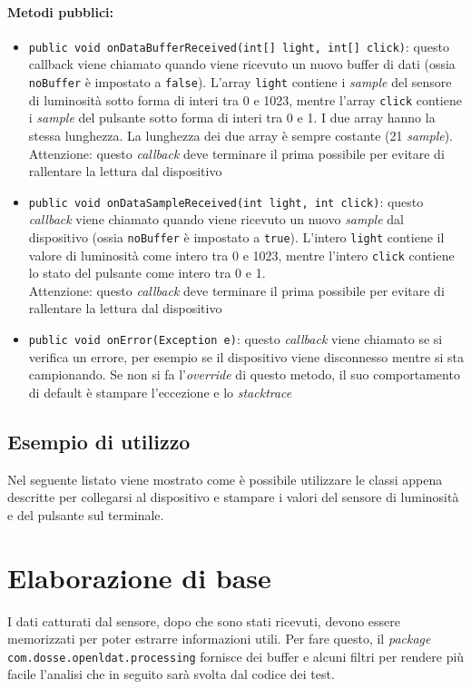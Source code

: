 \paragraph{Metodi pubblici:}\begin{itemize}
	\item \texttt{public void onDataBufferReceived(int[] light, int[] click){}}: questo callback viene chiamato quando viene ricevuto un nuovo buffer di dati (ossia \texttt{noBuffer} è impostato a \texttt{false}). L'array \texttt{light} contiene i \textit{sample} del sensore di luminosità sotto forma di interi tra 0 e 1023, mentre l'array \texttt{click} contiene i \textit{sample} del pulsante sotto forma di interi tra 0 e 1. I due array hanno la stessa lunghezza. La lunghezza dei due array è sempre costante (21 \textit{sample}).\\
	Attenzione: questo \textit{callback} deve terminare il prima possibile per evitare di rallentare la lettura dal dispositivo
	\item \texttt{public void onDataSampleReceived(int light, int click){}}: questo \textit{callback} viene chiamato quando viene ricevuto un nuovo \textit{sample} dal dispositivo (ossia \texttt{noBuffer} è impostato a \texttt{true}). L'intero \texttt{light} contiene il valore di luminosità come intero tra 0 e 1023, mentre l'intero \texttt{click} contiene lo stato del pulsante come intero tra 0 e 1.\\
	Attenzione: questo \textit{callback} deve terminare il prima possibile per evitare di rallentare la lettura dal dispositivo
	\item \texttt{public void onError(Exception e)}: questo \textit{callback} viene chiamato se si verifica un errore, per esempio se il dispositivo viene disconnesso mentre si sta campionando. Se non si fa l'\textit{override} di questo metodo, il suo comportamento di default è stampare l'eccezione e lo \textit{stacktrace}
\end{itemize}

\subsection{Esempio di utilizzo}
Nel seguente listato viene mostrato come è possibile utilizzare le classi appena descritte per collegarsi al dispositivo e stampare i valori del sensore di luminosità e del pulsante sul terminale.


\section{Elaborazione di base}
I dati catturati dal sensore, dopo che sono stati ricevuti, devono essere memorizzati per poter estrarre informazioni utili. Per fare questo, il \textit{package} \texttt{com.dosse.openldat.processing} fornisce dei buffer e alcuni filtri per rendere più facile l'analisi che in seguito sarà svolta dal codice dei test.

